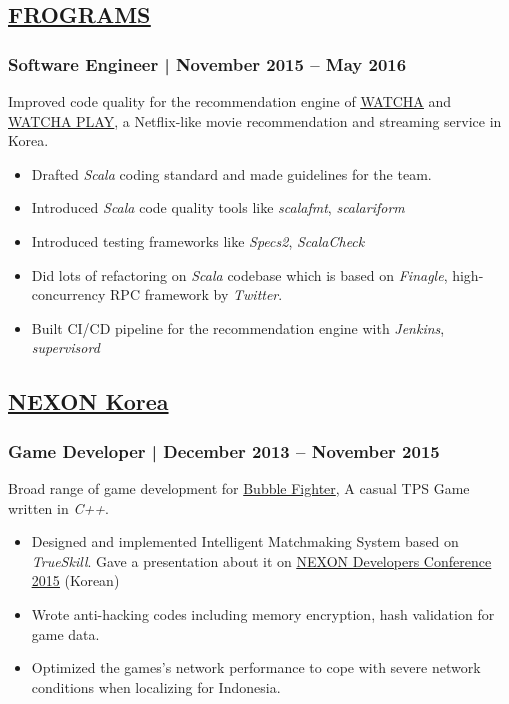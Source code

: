 \documentclass[11pt]{article}
\begin{document}
\subsection*{\underline{\href{http://frograms.com}{FROGRAMS}}}
\label{sec:orgcc8595d}
\subsubsection*{Software Engineer  | November 2015 – May 2016}
\label{sec:orgd8a6716}
Improved code quality for the recommendation engine of \uline{\href{https://watcha.net/}{WATCHA}} and \uline{\href{https://play.watcha.net}{WATCHA PLAY}},
a Netflix-like movie recommendation and streaming service in Korea.

\begin{itemize}
\item Drafted \emph{Scala} coding standard and made guidelines for the team.
\item Introduced \emph{Scala} code quality tools like \emph{scalafmt}, \emph{scalariform}
\item Introduced testing frameworks like \emph{Specs2}, \emph{ScalaCheck}
\item Did lots of refactoring on \emph{Scala} codebase which is based on \emph{Finagle}, high-concurrency RPC framework by \emph{Twitter}.
\item Built CI/CD pipeline for the recommendation engine with \emph{Jenkins}, \emph{supervisord}
\end{itemize}

\subsection*{\href{http://company.nexon.com/Eng/}{NEXON Korea}}
\label{sec:org3d4d3e5}
\subsubsection*{Game Developer  | December 2013 – November 2015}
\label{sec:org5f7edcf}
Broad range of game development for \href{http://bf.nexon.com}{Bubble Fighter}, A casual TPS Game written in \emph{C++}.

\begin{itemize}
\item Designed and implemented Intelligent Matchmaking System based on \emph{TrueSkill}.
Gave a presentation about it on \uline{\href{http://ndcreplay.nexon.com/NDC2015/sessions/NDC2015\_0048.html}{NEXON Developers Conference 2015}} (Korean)
\item Wrote anti-hacking codes including memory encryption, hash validation for game data.
\item Optimized the games's network performance to cope with severe network conditions when localizing for Indonesia.
\end{itemize}
\end{document}
